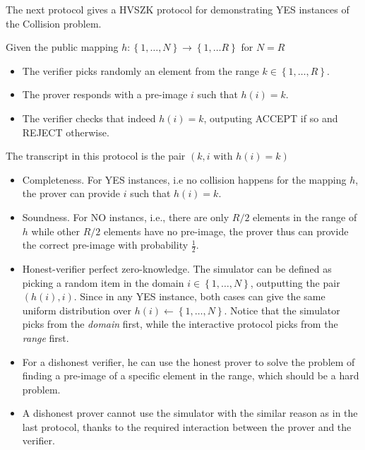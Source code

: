 \documentclass{article}
\begin{document}
The next protocol gives a HVSZK protocol for demonstrating \textsf{YES} instances of the Collision problem. 

\begin{boxx1}
Given the public mapping $h: \left\{ 1, \dots, N \right\} \rightarrow \left\{ 1, \dots R \right\}$ for $N = R$
\begin{itemize}
\item The verifier picks randomly an element from the range $k \in \left\{ 1, \dots, R \right\}$. 
\item The prover responds with a pre-image $i$ such that $h(i) = k$. 
\item The verifier checks that indeed $h(i) = k$, outputing \textsf{ACCEPT} if so and \textsf{REJECT} otherwise.
\end{itemize}
The transcript in this protocol is the pair $\left( k, i \text{ with }  h(i) = k \right)$
\end{boxx1}

\begin{itemize}
\item Completeness. For \textsf{YES} instances, i.e no collision happens for the mapping $h$, the prover can provide $i$ such that $h(i) = k$. 
\item Soundness. For \textsf{NO} instancs, i.e., there are only $R/2$ elements in the range of $h$ while other $R/2$ elements have no pre-image, the prover thus can provide the correct pre-image with probability $\frac{1}{2}$. 
\item Honest-verifier perfect zero-knowledge. The simulator can be defined as picking a random item in the domain $i \in \left\{ 1, \dots, N \right\}$, outputting the pair $\left( h(i), i \right)$. Since in any \textsf{YES} instance, both cases can give the same uniform distribution over $h(i) \leftarrow \left\{ 1, \dots, N \right\}$. Notice that the simulator picks from the \textit{domain} first, while the interactive protocol picks from the \textit{range} first. 
\item For a dishonest verifier, he can use the honest prover to solve the problem of finding a pre-image of a specific element in the range, which should be a hard problem. 
\item A dishonest prover cannot use the simulator with the similar reason as in the last protocol, thanks to the required interaction between the prover and the verifier. 
\end{itemize}
\end{document}
